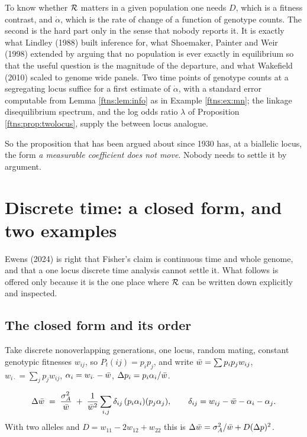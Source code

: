 To know whether $\mathcal{R}$ matters in a given population one needs $D$, which is a fitness contrast, and
$\dot\alpha$, which is the rate of change of a function of genotype counts. The second is the hard
part only in the sense that nobody reports it. It is exactly what Lindley (1988) built inference
for, what Shoemaker, Painter and Weir (1998) extended by arguing that no population is ever exactly
in equilibrium so that the useful question is the magnitude of the departure, and what Wakefield
(2010) scaled to genome wide panels. Two time points of genotype counts at a segregating locus
suffice for a first estimate of $\dot\alpha$, with a standard error computable from
Lemma \ref{ftns:lem:info} as in Example \ref{ftns:ex:mn}; the linkage disequilibrium spectrum, and the
log odds ratio $\lambda$ of Proposition \ref{ftns:prop:twolocus}, supply the between locus analogue.

So the proposition that has been argued about since 1930 has, at a biallelic locus, the form
\emph{a measurable coefficient does not move}. Nobody needs to settle it by argument.

\section{Discrete time: a closed form, and two examples}
\label{ftns:sec:discrete}

Ewens (2024) is right that Fisher's claim is continuous time and whole genome, and that a one locus
discrete time analysis cannot settle it. What follows is offered only because it is the one place
where $\mathcal{R}$ can be written down explicitly and inspected.

\subsection{The closed form and its order}

Take discrete nonoverlapping generations, one locus, random mating, constant genotypic fitnesses
$w_{ij}$, so $P_t(ij)=p_ip_j$, and write $\bar{w}=\sum p_ip_jw_{ij}$, $w_{i\cdot}=\sum_jp_jw_{ij}$,
$\alpha_i=w_{i\cdot}-\bar{w}$, $\Delta p_i=p_i\alpha_i/\bar{w}$.

\begin{theorem}
\label{ftns:thm:main}
$$
\Delta\bar{w}\;=\;\frac{\sigma^{2}_{A}}{\bar{w}}
\;+\;\frac{1}{\bar{w}^2}\sum_{i,j}\delta_{ij}\,(p_i\alpha_i)(p_j\alpha_j),
\qquad \delta_{ij}=w_{ij}-\bar{w}-\alpha_i-\alpha_j .
$$
With two alleles and $D=w_{11}-2w_{12}+w_{22}$ this is $\Delta\bar{w}=\sigma^{2}_{A}/\bar{w}+D(\Delta p)^2$.
\end{theorem}

